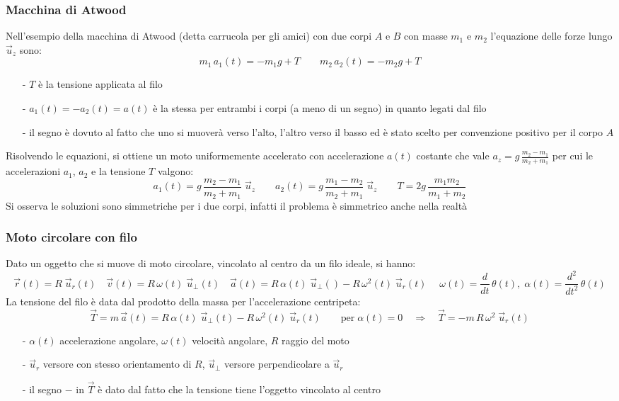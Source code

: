 \documentclass[a4paper]{article}
\newcommand\uz{\vec{u}_z}
\newcommand\ur{\vec{u}_r}
\newcommand\uper{\vec{u}_\perp}
\newcommand\dt{\frac{d}{dt}\,}
\newcommand\dts{\frac{d^2}{dt^2}\,}
\begin{document}
\subsubsection*{Macchina di Atwood}
Nell'esempio della macchina di Atwood (detta carrucola per gli amici) con due corpi \(A\) e \(B\) con masse \(m_1\) e \(m_2\)
l'equazione delle forze lungo \(\uz\) sono:
\[m_1 \, a_1(t) = -m_1 g + T \qquad m_2 \, a_2(t) = -m_2 g + T \]
\begin{itemize}[topsep=3pt, itemsep=0pt]
	\item[-] \(T\) è la tensione applicata al filo
	\item[-] \(a_1(t) = -a_2(t) = a(t)\) è la stessa per entrambi i corpi (a meno di un segno) in quanto legati dal filo
	\item[-] il	segno è dovuto al fatto che uno si muoverà verso l'alto, l'altro verso il basso ed è stato scelto per convenzione
	positivo per il corpo \(A\)
\end{itemize}
Risolvendo le equazioni, si ottiene un moto uniformemente accelerato con accelerazione \(a(t)\) costante che vale
\(\displaystyle a_z = g \, \frac{m_2 - m_1}{m_2 + m_1}\) per cui le accelerazioni \(a_1\), \(a_2\) e la tensione \(T\) valgono:
\[a_1(t) = g \, \frac{m_2 - m_1}{m_2 + m_1} \; \uz \qquad a_2(t) = g \, \frac{m_1 - m_2}{m_2 + m_1} \; \uz \qquad T = 2g \, \frac{m_1 m_2}{m_1 + m_2}\]
Si osserva le soluzioni sono simmetriche per i due corpi, infatti il problema è simmetrico anche nella realtà

\subsubsection*{Moto circolare con filo}
Dato un oggetto che si muove di moto circolare, vincolato al centro da un filo ideale, si hanno:
\[\vec{r}(t) = R \; \ur(t) \quad \vec{v}(t) = R \, \omega(t) \; \uper(t) \quad \vec{a}(t) = R \, \alpha(t) \; \uper() - R \, \omega^2(t) \; \ur(t) \quad \; \omega(t) = \dt \theta(t), \; \alpha(t) = \dts \theta(t)\]
La tensione del filo è data dal prodotto della massa per l'accelerazione centripeta:
\[\vec{T} = m \, \vec{a}(t) = R \, \alpha(t) \; \uper(t) - R \, \omega^2(t) \; \ur(t) \qquad \text{per} \; \alpha(t) = 0 \quad \Rightarrow \quad \vec{T} = - m \, R \, \omega^2 \; \ur(t)\] 
\begin{itemize}[topsep=3pt, itemsep=0pt]
	\item[-] \(\alpha(t)\) accelerazione angolare, \(\omega(t)\) velocità angolare, \(R\) raggio del moto
	\item[-] \(\ur\) versore con stesso orientamento di \(R\), \(\uper\) versore perpendicolare a \(\ur\)
	\item[-] il segno \(-\) in \(\vec{T}\) è dato dal fatto che la tensione tiene l'oggetto vincolato al centro
\end{itemize}
\newpage
\end{document}
